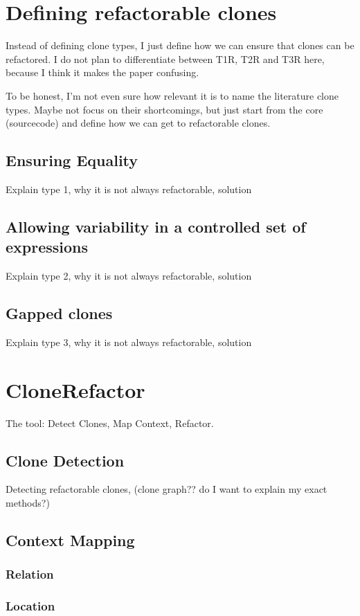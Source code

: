 \documentclass[conference]{IEEEtran}
\begin{document}
\section{Defining refactorable clones}
Instead of defining clone types, I just define how we can ensure that clones can be refactored. I do not plan to differentiate between T1R, T2R and T3R here, because I think it makes the paper confusing.

To be honest, I'm not even sure how relevant it is to name the literature clone types. Maybe not focus on their shortcomings, but just start from the core (sourcecode) and define how we can get to refactorable clones.

\subsection{Ensuring Equality}
Explain type 1, why it is not always refactorable, solution

\subsection{Allowing variability in a controlled set of expressions}
Explain type 2, why it is not always refactorable, solution

\subsection{Gapped clones}
Explain type 3, why it is not always refactorable, solution

\section{CloneRefactor}
The tool: Detect Clones, Map Context, Refactor.

\subsection{Clone Detection}
Detecting refactorable clones, (clone graph?? do I want to explain my exact methods?)

\subsection{Context Mapping}
\subsubsection{Relation}
\subsubsection{Location}
\end{document}
